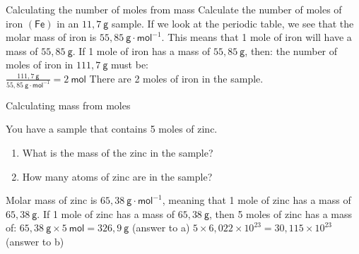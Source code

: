       \begin{wex}{Calculating the number of moles from mass }{
      \label{m38717*id276776}Calculate the number of moles of iron $\mathsf{(Fe)}$ in an $11,7 ~\mathsf{g}$ sample.  }
{
      \label{m38717*id276821}If we look at the periodic table, we see that the molar mass of iron is $55,85 ~\mathsf{g} \cdot \mathsf{mol}^{-1}$. This means that 1 mole of iron will have a mass of $55,85 ~\mathsf{g}$.
      \label{m38717*id276848}If 1 mole of iron has a mass of $55,85 ~\mathsf{g}$, then: the number of moles of iron in $111,7 ~\mathsf{g}$ must be: \\
$\frac{111,7 ~\mathsf{g}}{55,85 ~\mathsf{g} \cdot{\mathsf{mol}}^{-1}}=2 ~\mathsf{mol}$
      \label{m38717*id276911}There are 2 moles of iron in the sample. 
}
    \end{wex}
\vspace{-2cm}
      \begin{wex}{Calculating mass from moles }{
      \label{m38717*id276928}You have a sample that contains 5 moles of zinc.
      \label{m38717*id276934}\begin{enumerate}[noitemsep, label=\textbf{\alph*}. ] 
            \label{m38717*uid12}\item What is the mass of the zinc in the sample?
\label{m38717*uid13}\item How many atoms of zinc are in the sample?
\end{enumerate}
      \vspace{5pt} }
{
      \label{m38717*id276984}Molar mass of zinc is $65,38 ~\mathsf{g} \cdot \mathsf{mol}^{-1}$, meaning that 1 mole of zinc has a mass of $65,38 ~\mathsf{g}$.
      \label{m38717*id277021}If 1 mole of zinc has a mass of $65,38 ~\mathsf{g}$, then 5 moles of zinc has a mass of: $65,38 ~\mathsf{g} \times 5 ~\mathsf{mol}=326,9 ~\mathsf{g}$ (answer to a) 
$5 \times 6,022 \times {10}^{23} = 30,115 \times {10}^{23}$
      \label{m38717*id277263}(answer to b)
}
    \end{wex}
    \noindent \vspace{-1cm}
\label{m38717*secfhsst!!!underscore!!!id305}
